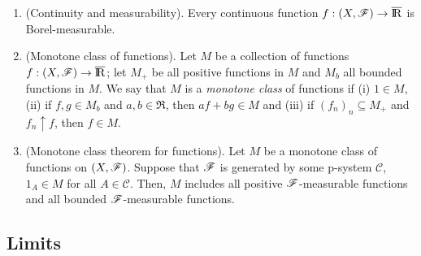 \documentclass[a4paper,10pt]{article}
\begin{document}
\begin{enumerate}
 \item (Continuity and measurability). Every continuous function $f:(X,\F)\to\barre$ is Borel-measurable. 
  
 \item (Monotone class of functions). Let $M$ be a collection of functions $f:(X,\F)\to\barre$; let $M_+$
       be all positive functions in $M$ and $M_b$ all bounded functions in $M$. We say that $M$ is a \textit{monotone class}
       of functions if (i) $1\in M$, (ii) if $f,g\in M_b$ and $a,b\in \Re$, then $af+bg\in M$ and (iii)
       if $(f_n)_n\subseteq M_+$ and $f_n \uparrow f$, then $f\in M$.
       
 \item (Monotone class theorem for functions). Let $M$ be a monotone class of functions on $(X,\mathscr{F})$. Suppose 
       that $\mathscr{F}$ is generated by some p-system $\mathcal{C}$, $1_A \in M$ for all $A\in\mathcal{C}$.
       Then, $M$ includes all positive $\mathscr{F}$-measurable functions and all bounded $\mathscr{F}$-measurable functions. 
               
\end{enumerate}

\subsection{Limits}
\end{document}
